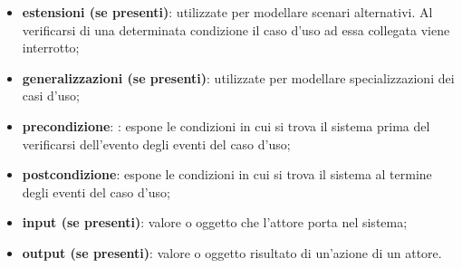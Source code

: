 \begin{itemize}
    \item \textbf{estensioni (se presenti)}: utilizzate per modellare scenari alternativi. Al verificarsi di una determinata condizione il caso d’uso ad essa collegata viene interrotto;
    \item \textbf{generalizzazioni (se presenti)}: utilizzate per modellare specializzazioni dei casi d’uso;
    \item \textbf{precondizione}: : espone le condizioni in cui si trova il sistema prima del verificarsi dell’evento degli eventi del caso d’uso;
    \item \textbf{postcondizione}: espone le condizioni in cui si trova il sistema al termine degli eventi del caso d’uso;
    \item \textbf{input (se presenti)}: valore o oggetto che l’attore porta nel sistema;
    \item \textbf{output (se presenti)}: valore o oggetto risultato di un’azione di un attore.
\end{itemize}
